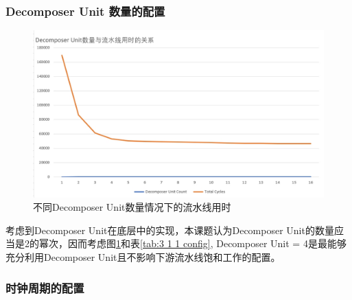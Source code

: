 \subsubsection{Decomposer Unit 数量的配置}
\begin{figure}[H]
    \centering
    \includegraphics[width=.5\linewidth]{figure/plot1.png}
    \caption{不同Decomposer Unit数量情况下的流水线用时}
    \label{fig:unit count time clock}
\end{figure}   
考虑到Decomposer Unit在底层中的实现，本课题认为Decomposer Unit的数量应当是2的幂次，因而考虑图\ref{fig:unit count time clock}和表\ref{tab:3 1 1 config}, Decomposer Unit = 4是最能够充分利用Decomposer Unit且不影响下游流水线饱和工作的配置。

\subsubsection{时钟周期的配置}

